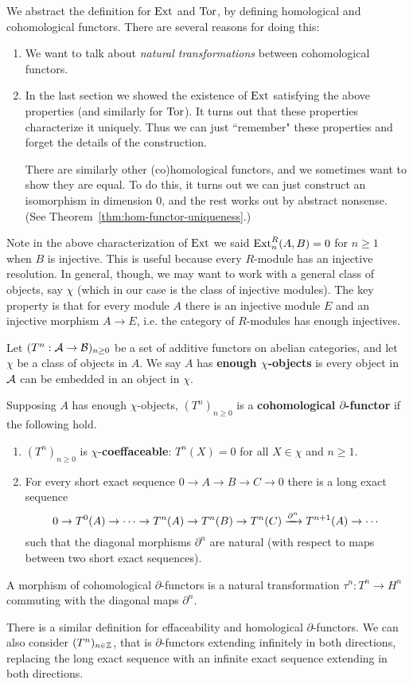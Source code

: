 We abstract the definition for $\Ext$ and $\Tor$, by defining homological and cohomological functors. There are several reasons for doing this:
\begin{enumerate}
\item
We want to talk about {\it natural transformations} between cohomological functors.
\item
In the last section we showed the existence of $\Ext$ satisfying the above properties (and similarly for $\Tor$). It turns out that these properties characterize it uniquely. Thus we can just ``remember" these properties and forget the details of the construction.

There are similarly other (co)homological functors, and we sometimes want to show they are equal. To do this, it turns out we can just construct an isomorphism in dimension 0, and the rest works out by abstract nonsense. (See Theorem~\ref{thm:hom-functor-uniqueness}.)
\end{enumerate}
Note in the above characterization of $\Ext$ we said $\Ext^R_n(A,B)=0$ for $n\ge 1$ when $B$ is injective. This is useful because every $R$-module has an injective resolution. In general, though, we may want to work with a general class of objects, say $\chi$ (which in our case is the class of injective modules). The key property is that for every module $A$ there is an injective module $E$ and an injective morphism $A\to E$, i.e. the category of $R$-modules has enough injectives. 
\begin{df}
Let $(T^n:\cal A\to \cal B)_{n\ge 0}$ be a set of additive functors on abelian categories, and let $\chi$ be a class of objects in $A$. We say $A$ has \textbf{enough $\chi$-objects} is every object in $\cal A$ can be embedded in an object in $\chi$.

Supposing $A$ has enough $\chi$-objects, $(T^n)_{n\ge 0}$ is a \textbf{cohomological $\partial$-functor} if the following hold.
\begin{enumerate}
\item
$(T^{n})_{n\ge 0}$ is $\chi$-\textbf{coeffaceable}: $T^n(X)=0$ for all $X\in \chi$ and $n\ge 1$.
\item
For every short exact sequence $0\to A\to B\to C\to 0$ there is a long exact sequence
\[
0\to T^0(A)\to \cdots \to T^n(A)\to T^n(B)\to T^n(C)\xra{\partial^n} T^{n+1}(A)\to \cdots
\]
such that the diagonal morphisms $\partial^n$ are natural (with respect to maps between two short exact sequences).
\end{enumerate}
A morphism of cohomological $\partial$-functors is a natural transformation $\tau^n:T^n\to H^n$ commuting with the diagonal maps $\partial^n$.
\end{df}
There is a similar definition for effaceability and homological $\partial$-functors. We can also consider $(T^n)_{n\in \Z}$, that is $\partial$-functors extending infinitely in both directions, replacing the long exact sequence with an infinite exact sequence extending in both directions.


